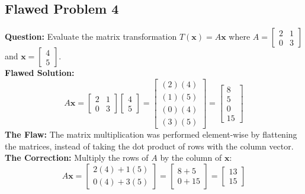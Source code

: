 \documentclass[11pt]{article}
\begin{document}
\subsection{Flawed Problem 4}
\textbf{Question:} Evaluate the matrix transformation $T(\mathbf{x}) = A\mathbf{x}$ where $A = \begin{bmatrix} 2 & 1 \\ 0 & 3 \end{bmatrix}$ and $\mathbf{x} = \begin{bmatrix} 4 \\ 5 \end{bmatrix}$. \\
\textbf{Flawed Solution:} 
\[ A\mathbf{x} = \begin{bmatrix} 2 & 1 \\ 0 & 3 \end{bmatrix} \begin{bmatrix} 4 \\ 5 \end{bmatrix} = \begin{bmatrix} (2)(4) \\ (1)(5) \\ (0)(4) \\ (3)(5) \end{bmatrix} = \begin{bmatrix} 8 \\ 5 \\ 0 \\ 15 \end{bmatrix} \]
\textbf{The Flaw:} The matrix multiplication was performed element-wise by flattening the matrices, instead of taking the dot product of rows with the column vector. \\
\textbf{The Correction:} Multiply the rows of $A$ by the column of $\mathbf{x}$:
\[ A\mathbf{x} = \begin{bmatrix} 2(4) + 1(5) \\ 0(4) + 3(5) \end{bmatrix} = \begin{bmatrix} 8 + 5 \\ 0 + 15 \end{bmatrix} = \begin{bmatrix} 13 \\ 15 \end{bmatrix} \]
\end{document}
